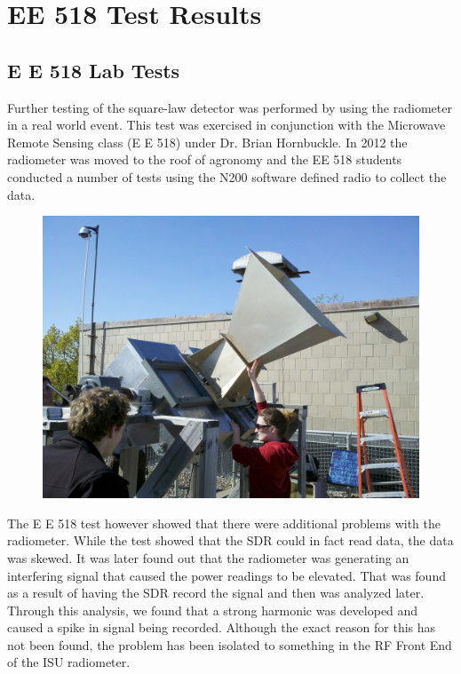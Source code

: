 \chapter{EE 518 Test Results}

\section*{E E 518 Lab Tests}

Further testing of the square-law detector was performed by using the radiometer in a real world event.  This test was exercised in conjunction with the Microwave Remote Sensing class (E E 518) under Dr. Brian Hornbuckle.  In 2012 the radiometer was moved to the roof of agronomy and the EE 518 students conducted a number of tests using the N200 software defined radio to collect the data.


{\begin{figure}[h!tb] 
\centering
\includegraphics[width=\textwidth]{Images/radiometer_roof.jpg}
\label{radiometer_roof}
\end{figure}
}

The E E 518 test however showed that there were additional problems with the radiometer.  While the test showed that the SDR could in fact read data, the data was skewed.  It was later found out that the radiometer was generating an interfering signal that caused the power readings to be elevated.  That was found as a result of having the SDR record the signal and then was analyzed later.  Through this analysis, we found that a strong harmonic was developed and caused a spike in signal being recorded.  Although the exact reason for this has not been found, the problem has been isolated to something in the RF Front End of the ISU radiometer. 


